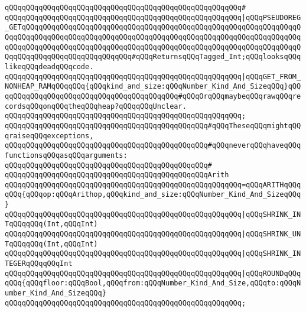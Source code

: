 \verb|qQQqqQQqqQQqqQQqqQQqqQQqqQQqqQQqqQQqqQQqqQQqqQQqqQQqqQQq#|\newline
\verb|qQQqqQQqqQQqqQQqqQQqqQQqqQQqqQQqqQQqqQQqqQQqqQQqqQQqqQQq|\verb#|qQQqPSEUDOREG_GETqQQqqQQqqQQqqQQqqQQqqQQqqQQqqQQqqQQqqQQqqQQqqQQqqQQqqQQqqQQqqQQqqQQqqQQqqQQqqQQqqQQqqQQqqQQqqQQqqQQqqQQqqQQqqQQqqQQqqQQqqQQqqQQqqQQqqQQqqQQqqQQqqQQqqQQqqQQqqQQqqQQqqQQqqQQqqQQqqQQqqQQqqQQqqQQqqQQqqQQqqQQqqQQqqQQqqQQqqQQqqQQqqQQqqQQqqQQq#\verb|#qQQqReturnsqQQqTagged_Int;qQQqlooksqQQqlikeqQQqdeadqQQqcode.|\newline
\verb|qQQqqQQqqQQqqQQqqQQqqQQqqQQqqQQqqQQqqQQqqQQqqQQqqQQqqQQq|\verb#|qQQqGET_FROM_NONHEAP_RAMqQQqqQQq{qQQqkind_and_size:qQQqNumber_Kind_And_SizeqQQq}qQQqqQQqqQQqqQQqqQQqqQQqqQQqqQQqqQQqqQQqqQQq#\verb|#qQQqOrqQQqmaybeqQQqrawqQQqrecordsqQQqonqQQqtheqQQqheap?qQQqqQQqUnclear.|\newline
\verb|qQQqqQQqqQQqqQQqqQQqqQQqqQQqqQQqqQQqqQQqqQQqqQQqqQQqqQQq;|\newline
\newline
\verb|qQQqqQQqqQQqqQQqqQQqqQQqqQQqqQQqqQQqqQQqqQQqqQQq#qQQqTheseqQQqmightqQQqraiseqQQqexceptions,|\newline
\verb|qQQqqQQqqQQqqQQqqQQqqQQqqQQqqQQqqQQqqQQqqQQqqQQq#qQQqneverqQQqhaveqQQqfunctionsqQQqasqQQqarguments:|\newline
\verb|qQQqqQQqqQQqqQQqqQQqqQQqqQQqqQQqqQQqqQQqqQQqqQQq#|\newline
\verb|qQQqqQQqqQQqqQQqqQQqqQQqqQQqqQQqqQQqqQQqqQQqqQQqArith|\newline
\verb|qQQqqQQqqQQqqQQqqQQqqQQqqQQqqQQqqQQqqQQqqQQqqQQqqQQqqQQq=qQQqARITHqQQqqQQq{qQQqop:qQQqArithop,qQQqkind_and_size:qQQqNumber_Kind_And_SizeqQQq}|\newline
\verb|qQQqqQQqqQQqqQQqqQQqqQQqqQQqqQQqqQQqqQQqqQQqqQQqqQQqqQQq|\verb#|qQQqSHRINK_INTqQQqqQQq(Int,qQQqInt)#\newline
\verb|qQQqqQQqqQQqqQQqqQQqqQQqqQQqqQQqqQQqqQQqqQQqqQQqqQQqqQQq|\verb#|qQQqSHRINK_UNTqQQqqQQq(Int,qQQqInt)#\newline
\verb|qQQqqQQqqQQqqQQqqQQqqQQqqQQqqQQqqQQqqQQqqQQqqQQqqQQqqQQq|\verb#|qQQqSHRINK_INTEGERqQQqqQQqInt#\newline
\verb|qQQqqQQqqQQqqQQqqQQqqQQqqQQqqQQqqQQqqQQqqQQqqQQqqQQqqQQq|\verb#|qQQqROUNDqQQqqQQq{qQQqfloor:qQQqBool,qQQqfrom:qQQqNumber_Kind_And_Size,qQQqto:qQQqNumber_Kind_And_SizeqQQq}#\newline
\verb|qQQqqQQqqQQqqQQqqQQqqQQqqQQqqQQqqQQqqQQqqQQqqQQqqQQqqQQq;|\newline
\newline
